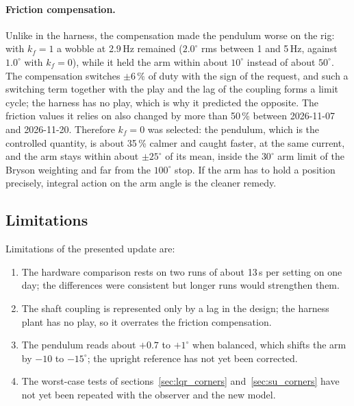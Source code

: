 \documentclass[a4paper,11pt]{article}
\begin{document}
\paragraph{Friction compensation.} Unlike in the harness, the compensation made the pendulum worse on the rig: with $k_f = 1$ a wobble at 2.9\,Hz remained ($2.0^\circ$ rms between 1 and 5\,Hz, against $1.0^\circ$ with $k_f = 0$), while it held the arm within about $10^\circ$ instead of about $50^\circ$. The compensation switches $\pm 6\,\%$ of duty with the sign of the request, and such a switching term together with the play and the lag of the coupling forms a limit cycle; the harness has no play, which is why it predicted the opposite. The friction values it relies on also changed by more than 50\,\% between 2026-11-07 and 2026-11-20. Therefore $k_f = 0$ was selected: the pendulum, which is the controlled quantity, is about 35\,\% calmer and caught faster, at the same current, and the arm stays within about $\pm 25^\circ$ of its mean, inside the $30^\circ$ arm limit of the Bryson weighting and far from the $100^\circ$ stop. If the arm has to hold a position precisely, integral action on the arm angle is the cleaner remedy.

\subsection{Limitations}
Limitations of the presented update are:
\begin{enumerate}
  \item The hardware comparison rests on two runs of about 13\,s per setting on one day; the differences were consistent but longer runs would strengthen them.
  \item The shaft coupling is represented only by a lag in the design; the harness plant has no play, so it overrates the friction compensation.
  \item The pendulum reads about $+0.7$ to $+1^\circ$ when balanced, which shifts the arm by $-10$ to $-15^\circ$; the upright reference has not yet been corrected.
  \item The worst-case tests of sections~\ref{sec:lqr_corners} and~\ref{sec:su_corners} have not yet been repeated with the observer and the new model.
\end{enumerate}

\end{document}
